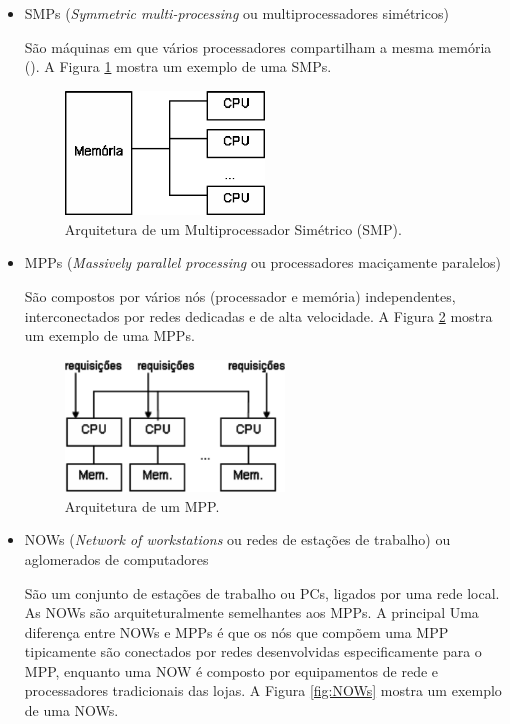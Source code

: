 \begin{itemize}
\item SMPs (\textit{Symmetric multi-processing} ou multiprocessadores simétricos)

	São máquinas em que vários processadores compartilham a mesma memória (\cite{bib:hwang1998scalable}). A Figura \ref{fig:SMPs} mostra um exemplo de uma SMPs.

\begin{figure}[!htb]
	\centering
	\includegraphics[width=0.50\textwidth]{fig/smp.png}
	\caption{Arquitetura de um Multiprocessador Simétrico (SMP).} 
	\label{fig:SMPs}
\end{figure}

\item MPPs (\textit{Massively parallel processing} ou processadores maciçamente paralelos)

	São compostos por vários nós (processador e memória) independentes, interconectados por redes dedicadas e de alta velocidade. A Figura \ref{fig:MPPs} mostra um exemplo de uma MPPs.

\begin{figure}[!htb]
	\centering
	\includegraphics[width=0.55\textwidth]{fig/mpp.png}
	\caption{Arquitetura de um MPP.} 
	\label{fig:MPPs}
\end{figure}

\item NOWs (\textit{Network of workstations} ou redes de estações de trabalho) ou aglomerados de computadores

	São um conjunto de estações de trabalho ou PCs, ligados por uma rede local. As NOWs são arquiteturalmente semelhantes aos MPPs. A principal Uma diferença entre NOWs e MPPs é que os nós que compõem uma MPP tipicamente são conectados por redes desenvolvidas especificamente para o MPP, enquanto uma NOW é composto por equipamentos de rede e processadores tradicionais das lojas. A Figura \ref{fig:NOWs} mostra um exemplo de uma NOWs.


\end{itemize}

